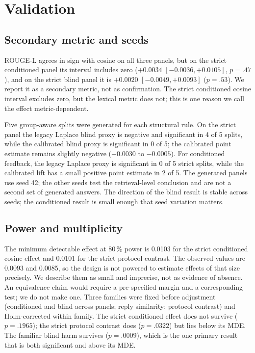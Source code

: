 \section{Validation}
\label{sec:validation}

\subsection{Secondary metric and seeds}
ROUGE-L agrees in sign with cosine on all three panels, but on the strict
conditioned panel its interval includes zero ($+0.0034$ $[-0.0036,+0.0105]$,
$p=.47$), and on the strict blind panel it is $+0.0020$ $[-0.0049,+0.0093]$
($p=.53$). We report it as a secondary metric, not as
confirmation. The strict conditioned cosine interval excludes zero, but the lexical
metric does not; this is one reason we call the effect metric-dependent.

Five group-aware splits were generated for each structural rule. On the strict
panel the legacy Laplace blind proxy is negative and significant in 4 of 5 splits,
while the calibrated blind proxy is significant in 0 of 5; the calibrated point
estimate remains slightly negative ($-0.0030$ to $-0.0005$). For conditioned
feedback, the legacy Laplace proxy is significant in 0 of 5 strict splits, while
the calibrated lift has a small positive point estimate in 2 of 5. The generated
panels use seed 42; the other seeds test the retrieval-level conclusion and are not
a second set of generated answers. The direction of the blind result is stable
across seeds; the conditioned result is small enough that seed variation matters.

\subsection{Power and multiplicity}
The minimum detectable effect at 80\,\% power is 0.0103 for the strict conditioned
cosine effect and 0.0101 for the strict protocol contrast. The observed values are
0.0093 and 0.0085, so the design is not powered to estimate effects of that size
precisely. We describe them as small and imprecise, not as evidence of absence. An
equivalence claim would require a pre-specified margin and a corresponding test; we
do not make one. Three families were fixed before adjustment (conditioned and blind
across panels; reply similarity; protocol contrast) and Holm-corrected within
family. The strict conditioned effect does not survive ($p=.1965$); the strict
protocol contrast does ($p=.0322$) but lies below its MDE. The familiar blind harm
survives ($p=.0009$), which is the one primary result that is both significant and
above its MDE.

